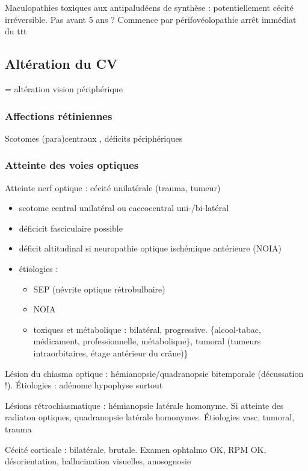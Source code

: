\documentclass[11pt]{article}
\begin{document}
Maculopathies toxiques aux antipaludéens de synthèse : potentiellement cécité
irréversible. Pas avant 5 ans ? Commence par périfovéolopathie \thus arrêt
immédiat du ttt \danger

\subsection{Altération du CV}
\label{sec:orgf5af726}
= altération vision périphérique

\subsubsection{Affections rétiniennes}
\label{sec:org02641b6}
Scotomes (para)centraux , déficits périphériques

\subsubsection{Atteinte des voies optiques}
\label{sec:org8d490aa}
Atteinte nerf optique : cécité unilatérale (trauma, tumeur) 
\begin{itemize}
\item scotome central unilatéral ou caecocentral uni-/bi-latéral
\item déficicit fasciculaire possible
\item déficit altitudinal si neuropathie optique ischémique antérieure (NOIA)
\item étiologies :
\begin{itemize}
\item SEP (névrite optique rétrobulbaire)
\item NOIA
\item toxiques et métabolique : bilatéral, progressive. \{alcool-tabac, médicament,
professionnelle, métabolique\}, tumoral (tumeurs intraorbitaires, étage
antérieur du crâne)\}
\end{itemize}
\end{itemize}

Lésion du chiasma optique : hémianopsie/quadranopsie bitemporale (décussation
!). Étiologies : adénome hypophyse surtout

Lésions rétrochiasmatique : hémianopsie latérale homonyme. Si atteinte des
radiaton optiques, quadranopsie latérale homonymes. Étiologies vasc, tumoral,
trauma

Cécité corticale : bilatérale, brutale. Examen ophtalmo OK, RPM OK,
désorientation, hallucination visuelles, anosognosie
\end{document}
